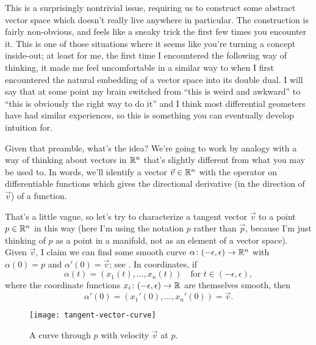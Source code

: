 This is a surprisingly nontrivial issue, requiring us to construct some abstract vector space which doesn't really live anywhere in particular. The construction is fairly non-obvious, and feels like a sneaky trick the first few times you encounter it. This is one of those situations where it seems like you're turning a concept inside-out; at least for me, the first time I encountered the following way of thinking, it made me feel uncomfortable in a similar way to when I first encountered the natural embedding of a vector space into its double dual. I will say that at some point my brain switched from ``this is weird and awkward'' to ``this is obviously the right way to do it'' and I think most differential geometers have had similar experiences, so this is something you can eventually develop intuition for.


Given that preamble, what's the idea? We're going to work by analogy with a way of thinking about vectors in $\mathbb{R}^n$ that's slightly different from what you may be used to. In words, we'll identify a vector $\vec{v} \in \mathbb{R}^n$ with the operator on differentiable functions which gives the directional derivative (in the direction of $\vec{v}$) of a function. 

That's a little vague, so let's try to characterize a tangent vector $\vec{v}$ to a point $p \in \mathbb{R}^n$ in this way (here I'm using the notation $p$ rather than $\vec{p}$, because I'm just thinking of $p$ as a point in a manifold, not as an element of a vector space). Given $\vec{v}$, I claim we can find some smooth curve $\alpha\colon\thinspace\! (-\epsilon, \epsilon) \to \mathbb{R}^n$ with $\alpha(0) = p$ and $\alpha'(0) = \vec{v}$; see . In coordinates, if
\[
	\alpha(t) = (x_1(t), \dots , x_n(t)) \quad \text{for } t \in (-\epsilon, \epsilon),
\]
where the coordinate functions $x_i\colon\thinspace\! (-\epsilon,\epsilon) \to \mathbb{R}$ are themselves smooth, then
\[
	\alpha'(0) = (x_1'(0), \dots , x_n'(0)) = \vec{v}.
\]

\begin{figure}[htbp]
	\centering
		\texttt{[image: tangent-vector-curve]}
	\caption{A curve through $p$ with velocity $\vec{v}$ at $p$.}
	\label{fig:tangent vector curve}
\end{figure}

